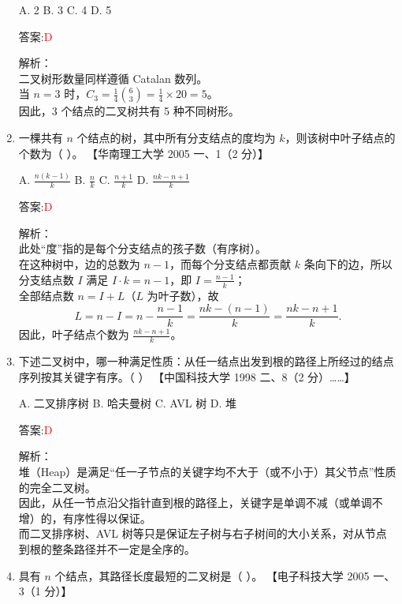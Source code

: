 \documentclass[lang=cn,newtx,10pt,scheme=chinese]{../../../elegantbook}
\begin{document}
\begin{enumerate}
    A. 2  
    B. 3  
    C. 4  
    D. 5

    答案:\textcolor{red}{D}

    解析：\\
    二叉树形数量同样遵循 Catalan 数列。\\
    当 $n=3$ 时，$C_3 = \frac{1}{4}\binom{6}{3} = \frac{1}{4} \times 20 = 5$。\\
    因此，3 个结点的二叉树共有 5 种不同树形。\\

\item 一棵共有 $n$ 个结点的树，其中所有分支结点的度均为 $k$，则该树中叶子结点的个数为（ ）。  
    【华南理工大学 2005 一、1（2 分）】

    A. $\displaystyle \frac{n(k-1)}{k}$  
    B. $\displaystyle \frac{n}{k}$  
    C. $\displaystyle \frac{n + 1}{k}$  
    D. $\displaystyle \frac{nk - n + 1}{k}$

    答案:\textcolor{red}{D}

    解析：\\
    此处“度”指的是每个分支结点的孩子数（有序树）。\\
    在这种树中，边的总数为 $n-1$，而每个分支结点都贡献 $k$ 条向下的边，所以分支结点数 $I$ 满足 $I \cdot k = n - 1$，即 $I = \frac{n-1}{k}$；\\
    全部结点数 $n = I + L$（$L$ 为叶子数），故  
    \[
      L = n - I = n - \frac{n-1}{k}
        = \frac{nk - (n-1)}{k}
        = \frac{nk - n + 1}{k}.
    \]  
    因此，叶子结点个数为 $\frac{nk - n + 1}{k}$。\\

\item 下述二叉树中，哪一种满足性质：从任一结点出发到根的路径上所经过的结点序列按其关键字有序。（ ）  
    【中国科技大学 1998 二、8（2 分）……】

    A. 二叉排序树  
    B. 哈夫曼树  
    C. AVL 树  
    D. 堆

    答案:\textcolor{red}{D}

    解析：\\
    堆（Heap）是满足“任一子节点的关键字均不大于（或不小于）其父节点”性质的完全二叉树。\\
    因此，从任一节点沿父指针直到根的路径上，关键字是单调不减（或单调不增）的，有序性得以保证。\\
    而二叉排序树、AVL 树等只是保证左子树与右子树间的大小关系，对从节点到根的整条路径并不一定是全序的。\\


    \item 具有 $n$ 个结点，其路径长度最短的二叉树是（ ）。  
    【电子科技大学 2005 一、3（1 分）】


\end{enumerate}
\end{document}
